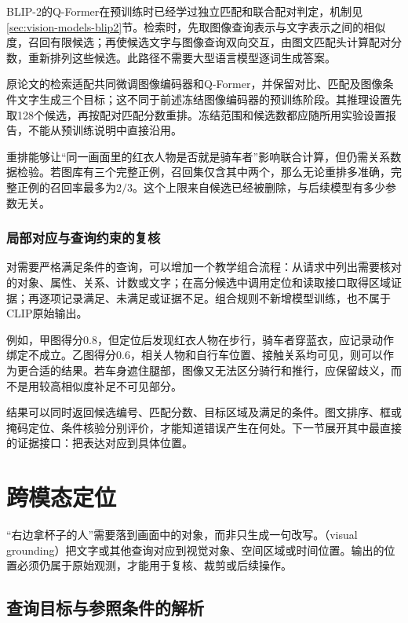 BLIP-2的Q-Former在预训练时已经学过独立匹配和联合配对判定，机制见\ref{sec:vision-models-blip2}节。检索时，先取图像查询表示与文字表示之间的相似度，召回有限候选；再使候选文字与图像查询双向交互，由图文匹配头计算配对分数，重新排列这些候选。此路径不需要大型语言模型逐词生成答案。

原论文的检索适配共同微调图像编码器和Q-Former，并保留对比、匹配及图像条件文字生成三个目标；这不同于前述冻结图像编码器的预训练阶段。其推理设置先取128个候选，再按配对匹配分数重排。冻结范围和候选数都应随所用实验设置报告，不能从预训练说明中直接沿用。

重排能够让“同一画面里的红衣人物是否就是骑车者”影响联合计算，但仍需关系数据检验。若图库有三个完整正例，召回集仅含其中两个，那么无论重排多准确，完整正例的召回率最多为$2/3$。这个上限来自候选已经被删除，与后续模型有多少参数无关。

\subsubsection{局部对应与查询约束的复核}
\label{sec:vision-understanding-constraint-check}

对需要严格满足条件的查询，可以增加一个教学组合流程：从请求中列出需要核对的对象、属性、关系、计数或文字；在高分候选中调用定位和读取接口取得区域证据；再逐项记录满足、未满足或证据不足。组合规则不新增模型训练，也不属于CLIP原始输出。

例如，甲图得分0.8，但定位后发现红衣人物在步行，骑车者穿蓝衣，应记录动作绑定不成立。乙图得分0.6，相关人物和自行车位置、接触关系均可见，则可以作为更合适的结果。若车身遮住腿部，图像又无法区分骑行和推行，应保留歧义，而不是用较高相似度补足不可见部分。

结果可以同时返回候选编号、匹配分数、目标区域及满足的条件。图文排序、框或掩码定位、条件核验分别评价，才能知道错误产生在何处。下一节展开其中最直接的证据接口：把表达对应到具体位置。

\section{跨模态定位}
\label{sec:vision-understanding-grounding}

“右边拿杯子的人”需要落到画面中的对象，而非只生成一句改写。（visual grounding）把文字或其他查询对应到视觉对象、空间区域或时间位置。输出的位置必须仍属于原始观测，才能用于复核、裁剪或后续操作。

\subsection{查询目标与参照条件的解析}
\label{sec:vision-understanding-grounding-query}

